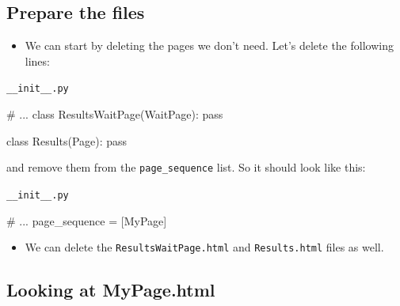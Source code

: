 \documentclass[
  letterpaper,
  DIV=11,
  numbers=noendperiod]{scrreprt}
\newenvironment{Shaded}{\begin{snugshade}}{\end{snugshade}}
\newcommand{\CommentTok}[1]{\textcolor[rgb]{0.37,0.37,0.37}{#1}}
\newcommand{\ControlFlowTok}[1]{\textcolor[rgb]{0.00,0.23,0.31}{#1}}
\newcommand{\KeywordTok}[1]{\textcolor[rgb]{0.00,0.23,0.31}{#1}}
\newcommand{\NormalTok}[1]{\textcolor[rgb]{0.00,0.23,0.31}{#1}}
\newcommand{\OperatorTok}[1]{\textcolor[rgb]{0.37,0.37,0.37}{#1}}
\providecommand{\tightlist}{%
  \setlength{\itemsep}{0pt}\setlength{\parskip}{0pt}}\usepackage{longtable,booktabs,array}
\begin{document}
\hypertarget{prepare-the-files}{%
\subsection{Prepare the files}\label{prepare-the-files}}

\begin{itemize}
\tightlist
\item
  We can start by deleting the pages we don't need. Let's delete the
  following lines:
\end{itemize}

\begin{codelisting}

\caption{\texttt{__init__.py}}

\begin{Shaded}
\begin{Highlighting}[]
\CommentTok{\# ...}
\KeywordTok{class}\NormalTok{ ResultsWaitPage(WaitPage):}
    \ControlFlowTok{pass}

\KeywordTok{class}\NormalTok{ Results(Page):}
    \ControlFlowTok{pass}
\end{Highlighting}
\end{Shaded}

\end{codelisting}

and remove them from the \texttt{page\_sequence} list. So it should look
like this:

\begin{codelisting}

\caption{\texttt{__init__.py}}

\begin{Shaded}
\begin{Highlighting}[]
\CommentTok{\# ...}
\NormalTok{page\_sequence }\OperatorTok{=}\NormalTok{ [MyPage]}
\end{Highlighting}
\end{Shaded}

\end{codelisting}

\begin{itemize}
\tightlist
\item
  We can delete the \texttt{ResultsWaitPage.html} and
  \texttt{Results.html} files as well.
\end{itemize}

\hypertarget{looking-at-mypage.html}{%
\subsection{Looking at MyPage.html}\label{looking-at-mypage.html}}
\end{document}
